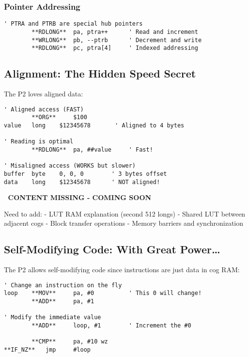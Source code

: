 \documentclass[11pt]{book}
\begin{document}
\hypertarget{pointer-addressing}{%
\subsubsection{Pointer Addressing}\label{pointer-addressing}}

\begin{lstlisting}
' PTRA and PTRB are special hub pointers
        **RDLONG**  pa, ptra++      ' Read and increment
        **WRLONG**  pb, --ptrb      ' Decrement and write
        **RDLONG**  pc, ptra[4]     ' Indexed addressing
\end{lstlisting}

\hypertarget{alignment-the-hidden-speed-secret}{%
\subsection{Alignment: The Hidden Speed
Secret}\label{alignment-the-hidden-speed-secret}}

The P2 loves aligned data:

\begin{lstlisting}
' Aligned access (FAST)
        **ORG**     $100
value   long    $12345678       ' Aligned to 4 bytes
        
' Reading is optimal
        **RDLONG**  pa, ##value     ' Fast!
        
' Misaligned access (WORKS but slower)
buffer  byte    0, 0, 0        ' 3 bytes offset
data    long    $12345678      ' NOT aligned!
\end{lstlisting}

\begin{missing}
🚧 \textbf{CONTENT MISSING - COMING SOON}

Need to add:
- LUT RAM explanation (second 512 longs)
- Shared LUT between adjacent cogs
- Block transfer operations
- Memory barriers and synchronization
\end{missing}

\hypertarget{self-modifying-code-with-great-power}{%
\subsection{Self-Modifying Code: With Great
Power\ldots{}}\label{self-modifying-code-with-great-power}}

The P2 allows self-modifying code since instructions are just data in
cog RAM:

\begin{lstlisting}
' Change an instruction on the fly
loop    **MOV**     pa, #0          ' This 0 will change!
        **ADD**     pa, #1
        
' Modify the immediate value
        **ADD**     loop, #1        ' Increment the #0
        
        **CMP**     pa, #10 wz
**IF_NZ**   jmp     #loop
\end{lstlisting}
\end{document}
